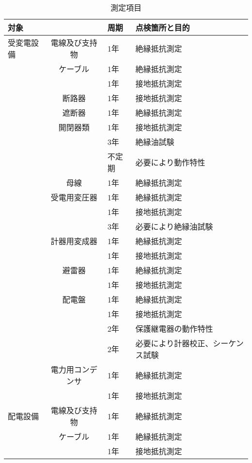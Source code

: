 \documentclass[10pt,a4paper,uplatex]{jsarticle}
\begin{document}
\begin{table}[b]
\scriptsize
  \caption{測定項目}
  \label{測定項目}
  \begin{tabular}{|l|c|p{1cm}|p{10cm}|} \hline
    対象         & & 周期 & 点検箇所と目的  \\ \hline
受変電設備
    &電線及び支持物  & 1年 & 絶縁抵抗測定  \\\cline{2-4}
    &ケーブル       & 1年 & 絶縁抵抗測定   \\
    &              & 1年 & 接地抵抗測定  \\ \cline{2-4}
    &断路器         & 1年 & 接地抵抗測定  \\ \cline{2-4}
    &遮断器         & 1年 & 絶縁抵抗測定  \\ 
    &開閉器類       & 1年 & 接地抵抗測定  \\
    &              & 3年 & 絶縁油試験  \\
    &              & 不定期 & 必要により動作特性  \\ \cline{2-4}
    &母線          & 1年 & 絶縁抵抗測定  \\\cline{2-4}
    &受電用変圧器   & 1年 & 絶縁抵抗測定  \\
    &              & 1年 & 接地抵抗測定  \\ 
    &              & 3年 & 必要により絶縁油試験 \\\cline{2-4}
    &計器用変成器   & 1年 & 絶縁抵抗測定  \\
    &              & 1年 & 接地抵抗測定  \\\cline{2-4}
    &避雷器         & 1年 & 絶縁抵抗測定  \\
    &              & 1年 & 接地抵抗測定  \\\cline{2-4}
    &配電盤         & 1年 & 絶縁抵抗測定  \\
    &              & 1年 & 接地抵抗測定  \\
    &              & 2年 & 保護継電器の動作特性  \\
    &              & 2年 & 必要により計器校正、シーケンス試験  \\\cline{2-4}
    &電力用コンデンサ& 1年 & 絶縁抵抗測定  \\
    &              & 1年 & 接地抵抗測定  \\\cline{2-4}
    \hline  
配電設備
    &電線及び支持物  & 1年 & 絶縁抵抗測定  \\\cline{2-4}
    &ケーブル       & 1年 & 絶縁抵抗測定   \\
    &              & 1年 & 接地抵抗測定  \\ \cline{2-4}

\end{tabular}
\end{table}
\end{document}

